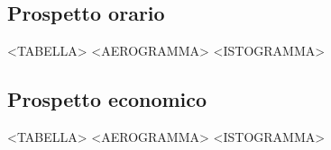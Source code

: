 \section{}

\subsection{Prospetto orario}

<TABELLA>
<AEROGRAMMA>
<ISTOGRAMMA>

\subsection{Prospetto economico}

<TABELLA>
<AEROGRAMMA>
<ISTOGRAMMA>

